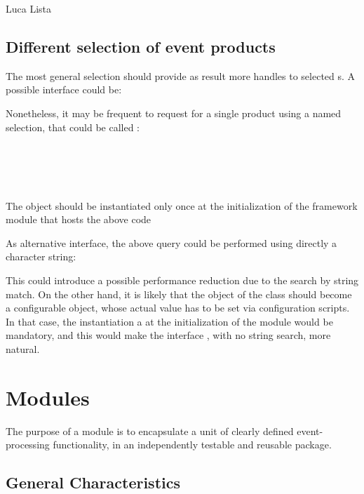 \documentclass[draftmode]{memarticle}
\newcommand{\EDProduct}{\classname{ED\-Product}}
\begin{document}
\begin{signednote}{Luca Lista}
\subsection{Different selection of event products}\label{sec:different_selectors}

The most general selection should provide as result more handles to
selected \EDProduct{}s. A possible interface could be:

\indent{}

Nonetheless, it may be frequent to request for a single product using
a named selection, that could be called  :

\indent{}\\
\indent{}\\
\indent{}\\
\indent{}\\

The  object should be instantiated only once
at the initialization of the framework module
that hosts the above code

As alternative interface, the above query could be performed using
directly a character string:

\indent{}

This could introduce a possible performance reduction due to the
search by string match. On the other hand, it is likely that the
object of the class  should become a
configurable object, whose actual value has to be set via configuration
scripts. In that case, the instantiation a at the initialization of
the module would be mandatory, and this would make the interface
, with no string search, more natural.
\end{signednote}


\section{Modules}\label{sec:modules}

The purpose of a module
is to encapsulate a unit of clearly defined
event-processing functionality,
in an independently testable and reusable package.

\subsection{General Characteristics}
\end{document}
